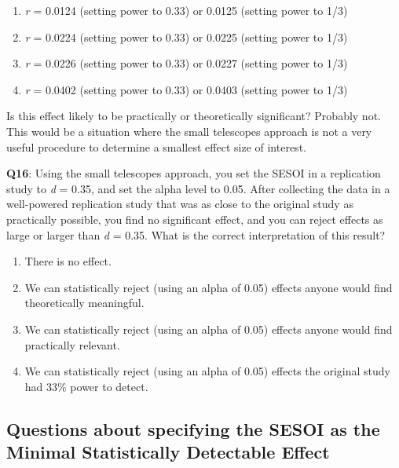\documentclass[
  oneside]{krantz}
\providecommand{\tightlist}{%
  \setlength{\itemsep}{0pt}\setlength{\parskip}{0pt}}
\begin{document}
\begin{enumerate}
\def\labelenumi{\Alph{enumi})}
\tightlist
\item
  \emph{r} = 0.0124 (setting power to 0.33) or 0.0125 (setting power to 1/3)
\item
  \emph{r} = 0.0224 (setting power to 0.33) or 0.0225 (setting power to 1/3)
\item
  \emph{r} = 0.0226 (setting power to 0.33) or 0.0227 (setting power to 1/3)
\item
  \emph{r} = 0.0402 (setting power to 0.33) or 0.0403 (setting power to 1/3)
\end{enumerate}

Is this effect likely to be practically or theoretically significant? Probably not. This would be a situation where the small telescopes approach is not a very useful procedure to determine a smallest effect size of interest.

\textbf{Q16}: Using the small telescopes approach, you set the SESOI in a replication study to \emph{d} = 0.35, and set the alpha level to 0.05. After collecting the data in a well-powered replication study that was as close to the original study as practically possible, you find no significant effect, and you can reject effects as large or larger than \emph{d} = 0.35. What is the correct interpretation of this result?

\begin{enumerate}
\def\labelenumi{\Alph{enumi})}
\tightlist
\item
  There is no effect.
\item
  We can statistically reject (using an alpha of 0.05) effects anyone would find theoretically meaningful.
\item
  We can statistically reject (using an alpha of 0.05) effects anyone would find practically relevant.
\item
  We can statistically reject (using an alpha of 0.05) effects the original study had 33\% power to detect.
\end{enumerate}

\hypertarget{questions-about-specifying-the-sesoi-as-the-minimal-statistically-detectable-effect}{%
\subsection{Questions about specifying the SESOI as the Minimal Statistically Detectable Effect}\label{questions-about-specifying-the-sesoi-as-the-minimal-statistically-detectable-effect}}
\end{document}
